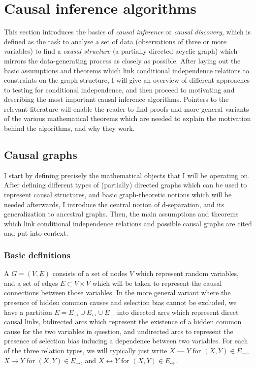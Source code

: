 \section{Causal inference algorithms}
This section introduces the basics of \textit{causal inference} or \textit{causal discovery}, which is defined as the task to analyse a set of data (observations of three or more variables) to find a \textit{causal structure} (a partially directed acyclic graph) which mirrors the data-generating process as closely as possible. After laying out the basic assumptions and theorems which link conditional independence relations to constraints on the graph structure, I will give an overview of different approaches to testing for conditional independence, and then proceed to motivating and describing the most important causal inference algorithms. Pointers to the relevant literature will enable the reader to find proofs and more general variants of the various mathematical theorems which are needed to explain the motivation behind the algorithms, and why they work.

\subsection{Causal graphs}
I start by defining precisely the mathematical objects that I will be operating on. After defining different types of (partially) directed graphs which can be used to represent causal structures, and basic graph-theoretic notions which will be needed afterwards, I introduce the central notion of d-separation, and its generalization to ancestral graphs. Then, the main assumptions and theorems which link conditional independence relations and possible causal graphs are cited and put into context.

\subsubsection{Basic definitions}
A  $G = (V,E)$ consists of a set of nodes $V$ which represent random variables, and a set of edges $E \subset V \times V$ which will be taken to represent the causal connections between those variables. In the more general variant where the presence of hidden common causes and selection bias cannot be excluded, we have a partition $E = E_\rightarrow \cup E_\leftrightarrow \cup E_\text{---}$ into directed arcs which represent direct causal links, bidirected arcs which represent the existence of a hidden common cause for the two variables in question, and undirected arcs to represent the presence of selection bias inducing a dependence between two variables. For each of the three relation types, we will typically just write $X \text{ --- } Y$ for $(X,Y) \in E_\text{---}$, $X \rightarrow Y$ for $(X,Y) \in E_\rightarrow$, and $X \leftrightarrow Y$ for $(X,Y) \in E_\leftrightarrow$.

